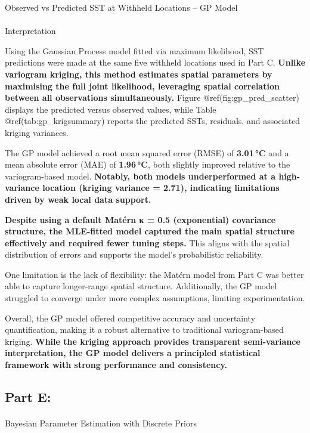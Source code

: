 \documentclass[
  11pt,
]{article}
\makeatletter
\let\oldparagraph\paragraph
\renewcommand{\paragraph}{
    \@ifstar
      \xxxParagraphStar
      \xxxParagraphNoStar
  }
\newcommand{\xxxParagraphStar}[1]{\oldparagraph*{#1}\mbox{}}
\newcommand{\xxxParagraphNoStar}[1]{\oldparagraph{#1}\mbox{}}
\makeatother
\begin{document}
Observed vs Predicted SST at Withheld Locations -- GP Model

\paragraph{Interpretation}\label{interpretation}

Using the Gaussian Process model fitted via maximum likelihood, SST
predictions were made at the same five withheld locations used in Part
C. \textbf{Unlike variogram kriging, this method estimates spatial
parameters by maximising the full joint likelihood, leveraging spatial
correlation between all observations simultaneously.} Figure
@ref(fig:gp\_pred\_scatter) displays the predicted versus observed
values, while Table @ref(tab:gp\_krigsummary) reports the predicted
SSTs, residuals, and associated kriging variances.

The GP model achieved a root mean squared error (RMSE) of
\textbf{3.01\,°C} and a mean absolute error (MAE) of \textbf{1.96\,°C},
both slightly improved relative to the variogram-based model.
\textbf{Notably, both models underperformed at a high-variance location
(kriging variance = 2.71), indicating limitations driven by weak local
data support.}

\textbf{Despite using a default Matérn κ = 0.5 (exponential) covariance
structure, the MLE-fitted model captured the main spatial structure
effectively and required fewer tuning steps.} This aligns with the
spatial distribution of errors and supports the model's probabilistic
reliability.

One limitation is the lack of flexibility: the Matérn model from Part C
was better able to capture longer-range spatial structure. Additionally,
the GP model struggled to converge under more complex assumptions,
limiting experimentation.

Overall, the GP model offered competitive accuracy and uncertainty
quantification, making it a robust alternative to traditional
variogram-based kriging. \textbf{While the kriging approach provides
transparent semi-variance interpretation, the GP model delivers a
principled statistical framework with strong performance and
consistency.}

\subsection{Part E:}\label{part-e}

\paragraph{Bayesian Parameter Estimation with Discrete
Priors}\label{bayesian-parameter-estimation-with-discrete-priors}
\end{document}
